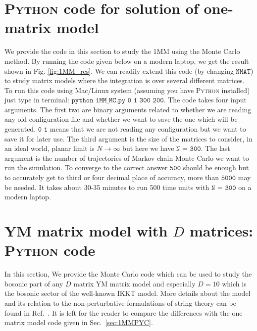 \documentclass[11pt]{article}
\newcommand{\PY}{\textsc{Python }}
\begin{document}
\section{\label{sec:1MMPYC}\PY code for solution of one-matrix model}
We provide the code in this section to study the 1MM using the Monte Carlo method. By running the code given below
on a modern laptop, we get the result shown in 
Fig. \ref{fig:1MM_res}. We can readily extend this code (by changing $\texttt{NMAT}$) to study matrix models where the integration is over several different matrices. 
To run this code using Mac/Linux system (assuming you have \PY installed) just type in terminal: 
$\texttt{python 1MM\_MC.py 0 1 300 200}$. The code takes four input arguments. The first two are binary arguments
related to whether we are reading any old configuration file and whether we want to save the one which will be 
generated. $\texttt{0 1}$ means that we are not reading any configuration but we want to save it for later use. 
The third argument is the size of the matrices to consider, in an ideal world, planar limit is $ N \to \infty$ but here
we have $\texttt{N = 300}$. The last argument is the 
number of trajectories of Markov chain Monte Carlo we want to run the simulation. To converge to the correct answer $\texttt{500}$ should be enough but to accurately get to third or four decimal place of accuracy, more than $\texttt{5000}$ may be needed. It takes about 30-35 minutes to run 500 time units with $\texttt{N = 300}$ on a modern laptop. 


\begin{footnotesize} 
\begin{mdframed}[backgroundcolor=mauve!3] 

\end{mdframed} 
\end{footnotesize} 

\vspace{10mm}
 
\section{\label{sec:YMC}YM matrix model with $D$ matrices: \PY code}

In this section, We provide the Monte Carlo code which can be used to study the bosonic part of any $D$ matrix YM matrix model and especially $D=10$ which is the bosonic sector of the well-known IKKT model. More details about the model and its relation to the non-perturbative formulations of string theory can be found in Ref.~\cite{Hotta:1998en}.
It is left for the reader to compare the differences with the one matrix model code given in Sec.~\ref{sec:1MMPYC}. 
\end{document}
